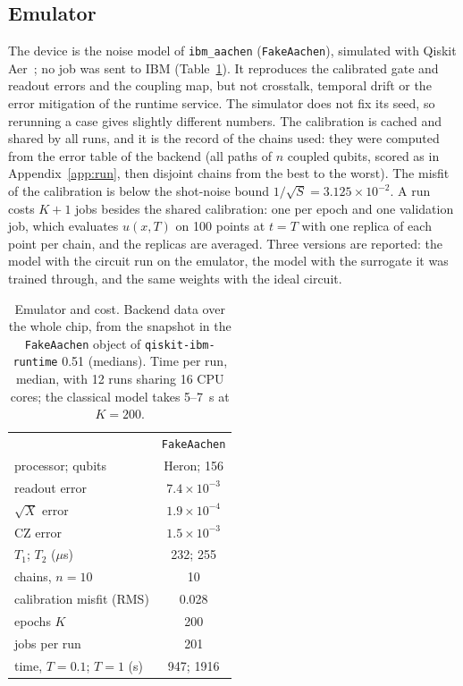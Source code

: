 \documentclass[floatfix,aps,pra,twocolumn,superscriptaddress,10pt,nofootinbib]{revtex4-2}
\begin{document}
\begin{appendices}
\subsection{Emulator}\label{app:emu}
The device is the noise model of \texttt{ibm\_aachen} (\texttt{FakeAachen}), simulated with Qiskit Aer~\cite{javadiabhari2024qiskit}; no job was sent to IBM (Table~\ref{tab:emu}). It reproduces the calibrated gate and readout errors and the coupling map, but not crosstalk, temporal drift or the error mitigation of the runtime service. The simulator does not fix its seed, so rerunning a case gives slightly different numbers. The calibration is cached and shared by all runs, and it is the record of the chains used: they were computed from the error table of the backend (all paths of $n$ coupled qubits, scored as in Appendix~\ref{app:run}, then disjoint chains from the best to the worst). The misfit of the calibration is below the shot-noise bound $1/\sqrt S=3.125\times10^{-2}$. A run costs $K+1$ jobs besides the shared calibration: one per epoch and one validation job, which evaluates $u(x,T)$ on 100 points at $t=T$ with one replica of each point per chain, and the replicas are averaged. Three versions are reported: the model with the circuit run on the emulator, the model with the surrogate it was trained through, and the same weights with the ideal circuit.

\begin{table}[h]
\caption{\justifying Emulator and cost. Backend data over the whole chip, from the snapshot in the \texttt{FakeAachen} object of \texttt{qiskit-ibm-runtime} 0.51 (medians). Time per run, median, with 12 runs sharing 16 CPU cores; the classical model takes 5--7~s at $K=200$.}
\label{tab:emu}
\setlength{\tabcolsep}{4pt}
\footnotesize
\begin{ruledtabular}
\begin{tabular}{lc}
 & \texttt{FakeAachen}\\
\colrule
processor; qubits & Heron; 156\\
readout error & $7.4\times10^{-3}$\\
$\sqrt X$ error & $1.9\times10^{-4}$\\
CZ error & $1.5\times10^{-3}$\\
$T_1$; $T_2$ ($\mu$s) & 232; 255\\
chains, $n=10$ & 10\\
calibration misfit (RMS) & 0.028\\
epochs $K$ & 200\\
jobs per run & 201\\
time, $T=0.1$; $T=1$ (s) & 947; 1916\\
\end{tabular}
\end{ruledtabular}
\end{table}


\end{appendices}
\end{document}

